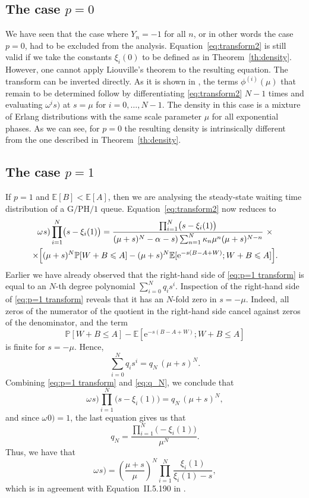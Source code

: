 \documentclass[reqno, 11pt, a4paper]{article}
\theoremstyle{plain}
\theoremstyle{remark}
\numberwithin{equation}{section}
\begin{document}
\subsection*{The case $p=0$}
We have seen that the case where $Y_n=-1$ for all $n$, or in other words the case $p=0$, had to be excluded from the analysis. Equation~\eqref{eq:transform2} is still valid if we take the constants $\xi_i(0)$ to be defined as in Theorem~\ref{th:density}. However, one cannot apply Liouville's theorem to the resulting equation. The transform can be inverted directly. As it is shown in \cite{vlasiou05}, the terms $\phi^{(i)}(\mu)$ that remain to be determined follow by differentiating \eqref{eq:transform2} $N-1$ times and evaluating ${\mbox{$\omega^{i}$}}s)$ at $s=\mu$ for $i=0,\ldots,N-1$. The density in this case is a mixture of Erlang distributions with the same scale parameter $\mu$ for all exponential phases. As we can see, for $p=0$ the resulting density is intrinsically different from the one described in Theorem~\ref{th:density}.

\subsection*{The case $p=1$}
If $p=1$ and ${\mathbb{E}}[B]<{\mathbb{E}}[A]$, then we are analysing the steady-state waiting time distribution of a $\mathrm{G/PH/1}$ queue. Equation~\eqref{eq:transform2} now reduces to
\begin{multline}\label{eq:p=1 transform}
{\mbox{$\omega^{}$}}s)\prod_{i=1}^{N}\bigl(s-\xi_i(1)\bigr)=\frac{\prod_{i=1}^{N}\bigl(s-\xi_i(1)\bigr)}{(\mu+s)^N-{\mbox{$\alpha^{}$}}-s)\sum_{n=1}^N \kappa_n \mu^n(\mu+s)^{N-n}}\ \times\\
\times\Bigl[(\mu+s)^N{\mathbb{P}}[W+B\leqslant A]-(\mu+s)^N {\mathbb{E}}[\mathrm{e}^{-s(B-A+W)};W+B\leqslant A]\Bigl].
\end{multline}
Earlier we have already observed that the right-hand side of \eqref{eq:p=1 transform} is equal to an $N$-th degree polynomial $\sum_{i=0}^N q_i s^i$. Inspection of the right-hand side of \eqref{eq:p=1 transform} reveals that it has an $N$-fold zero in $s=-\mu$. Indeed, all zeros of the numerator of the quotient in the right-hand side cancel against zeros of the denominator, and the term
$$
{\mathbb{P}}[W+B\leqslant A]-{\mathbb{E}}[\mathrm{e}^{-s(B-A+W)};W+B\leqslant A]
$$
is finite for $s=-\mu$.
Hence,
\begin{equation}\label{eq:q_N}
\sum_{i=0}^N q_i s^i=q_N\, (\mu+s)^N.
\end{equation}
Combining \eqref{eq:p=1 transform} and \eqref{eq:q_N}, we conclude that
$$
{\mbox{$\omega^{}$}}s)\prod_{i=1}^{N}\bigl(s-\xi_i(1)\bigr)=q_N\, (\mu+s)^N,
$$
and since ${\mbox{$\omega^{}$}}0)=1$, the last equation gives us that
$$
q_N=\frac{\prod_{i=1}^{N}\bigl(-\xi_i(1)\bigr)}{\mu^N}.
$$
Thus, we have that
$$
{\mbox{$\omega^{}$}}s)=\left(\frac{\mu+s}{\mu}\right)^N\prod_{i=1}^{N}\frac{\xi_i(1)}{\xi_i(1)-s},
$$
which is in agreement with Equation~II.5.190 in \cite[p.\ 324]{cohen-SSQ}.
\end{document}
